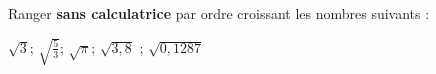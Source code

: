 
Ranger \textbf{sans calculatrice} par ordre croissant les nombres suivants :

 $\sqrt{3}$; $\sqrt{\frac{5}{3}}$; $\sqrt{\pi}$; $ \sqrt{3,8}$ ; $ \sqrt{0,1287}$

